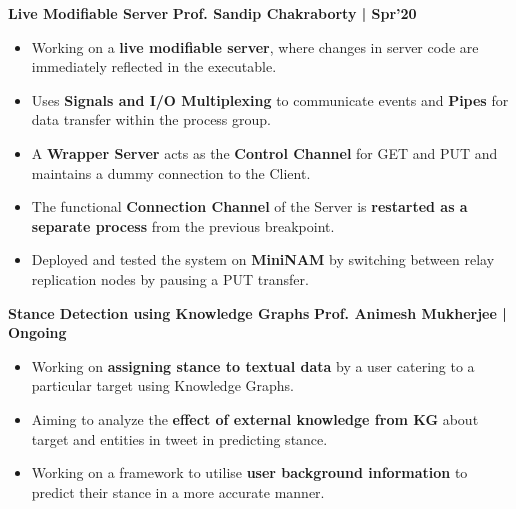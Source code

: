 \documentclass[10pt]{article}
\begin{document}
\vspace{-0.1ex}
{\color{headliner} \spacedhrule{0.15ex}{1.0ex}}
\large {\textbf{Live Modifiable Server}} \normalsize 
\href{https://github.com/shmundhra/Live-Modifiable-Server}{\hspace{0.5ex}\faGithub} {\hfill} \textbf{Prof. Sandip Chakraborty | Spr'20}\\[-1.75em]
\begin{itemize}
    \item Working on a \textbf{live modifiable server}, where changes in server code are immediately reflected in the executable.\\[-1.9em]
    \item Uses \textbf{Signals and I/O Multiplexing} to communicate events and \textbf{Pipes} for data transfer within the process group.\\[-1.9em]
    \item A \textbf{Wrapper Server} acts as the \textbf{Control Channel} for GET and PUT and maintains a dummy connection to the Client.\\[-1.9em]
    \item The functional \textbf{Connection Channel} of the Server is \textbf{restarted as a separate process} from the previous breakpoint.\\[-1.9em]
    \item Deployed and tested the system on \textbf{MiniNAM} by switching between relay replication nodes by pausing a PUT transfer. \\[-1em]
\end{itemize}
\iffalse
\large {\textbf{Stance Detection using Knowledge Graphs}} \normalsize \href{}{} {\hfill} \textbf{Prof. Animesh Mukherjee | Ongoing}\\[-1.75em]
\begin{itemize}
    \item Working on \textbf{assigning stance to textual data} by a user catering to a particular target using Knowledge Graphs.\\[-1.9em]
    \item Aiming to analyze the \textbf{effect of external knowledge from KG} about target and entities in tweet in predicting stance.\\[-1.9em]
    \item Working on a framework to utilise \textbf{user background information} to predict their stance in a more accurate manner. \\[-1em]
\end{itemize}
\end{document}
